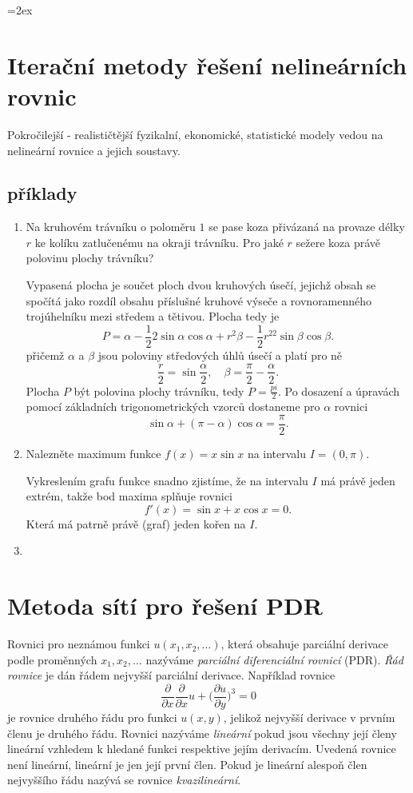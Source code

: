 \documentclass[a4paper,10pt]{article}
\def\prtl{\partial}                                        %
\begin{document}
\parskip=2ex
\parindent=0pt

\section{Iterační metody řešení nelineárních rovnic}
Pokročilejší - realističtější fyzikalní, ekonomické, statistické modely vedou na nelineární rovnice a jejich soustavy.
\subsection{příklady}
\begin{enumerate}
 \item Na kruhovém trávníku o poloměru $1$ se pase koza přivázaná na provaze délky $r$ ke kolíku zatlučenému na okraji trávníku.
 Pro jaké $r$ sežere koza právě polovinu plochy trávníku?

 Vypasená plocha je součet ploch dvou kruhových úsečí, jejichž obsah se spočítá jako rozdíl obsahu příslušné kruhové výseče a
 rovnoramenného trojúhelníku mezi středem a tětivou. Plocha tedy je
\[
 P=\alpha-\frac12 2\sin\alpha\cos\alpha+r^2\beta-\frac12r^22\sin\beta\cos\beta.
\]
 přičemž $\alpha$ a $\beta$ jsou poloviny středových úhlů úsečí a platí pro ně
\[
 \frac{r}{2}=\sin\frac{\alpha}{2},\quad \beta=\frac{\pi}{2}-\frac{\alpha}{2}.
\]
 Plocha $P$ být polovina plochy trávníku, tedy $P=\frac{pi}{2}$. Po dosazení a úpravách pomocí základních trigonometrických vzorců
dostaneme pro $\alpha$ rovnici
\[
 \sin\alpha+(\pi-\alpha)\cos\alpha=\frac{\pi}{2}.
\]

 \item Nalezněte maximum funkce $f(x)=x\sin x$ na intervalu $I=(0,\pi)$.

 Vykreslením grafu funkce snadno zjistíme, že na intervalu $I$ má právě jeden extrém, takže
 bod maxima splňuje rovnici
 \[
    f'(x)=\sin x +x\cos x =0.
 \]
 Která má patrně právě (graf) jeden kořen na $I$.
 \item 


\end{enumerate}



\section{Metoda sítí pro řešení PDR}
Rovnici pro neznámou funkci $u(x_1,x_2,\dots)$, která obsahuje parciální derivace podle proměnných 
$x_1,x_2,\dots$ nazýváme {\it parciální diferenciální rovnicí} (PDR). {\it Řád rovnice} je dán řádem nejvyšší parciální derivace.
Například rovnice
\[
 \frac{\prtl }{\prtl x}\frac{\prtl}{\prtl x} u + \big(\frac{\prtl u}{\prtl y}\big)^3=0
\]
je rovnice druhého řádu pro funkci $u(x,y)$, jelikož nejvyšší derivace v prvním členu je druhého řádu.
Rovnici nazýváme {\it lineární} pokud jsou všechny její členy lineární vzhledem k hledané funkci
respektive jejím derivacím. Uvedená rovnice není lineární, lineární je jen její první člen.
Pokud je lineární alespoň člen nejvyššího řádu nazývá se rovnice {\it kvazilineární}.
 
\end{document}
